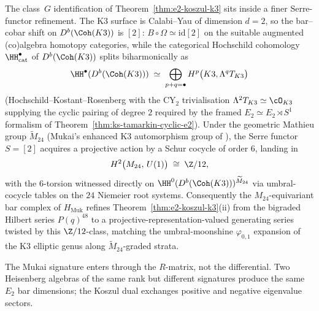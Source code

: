 \begin{remark}
\label{rem:e2-cy2-shift-schur-cocycle}
The class~$G$ identification of Theorem~\ref{thm:e2-koszul-k3} sits inside
a finer Serre-functor refinement. The K3 surface is Calabi--Yau of dimension
$d = 2$, so the bar--cobar shift on $D^{b}(\Coh(K3))$ is $[2]$:
$B \circ \Omega \simeq \mathrm{id}[2]$ on the suitable augmented
(co)algebra homotopy categories, while the categorical Hochschild
cohomology $\HH^{\bullet}_{\mathrm{cat}}$ of $D^{b}(\Coh(K3))$ splits
biharmonically as
\[
 \HH^{\bullet}(D^{b}(\Coh(K3)))
 \;\simeq\; \bigoplus_{p + q = \bullet}
 H^{p}\bigl(K3, \Lambda^{q} T_{K3}\bigr)
\]
(Hochschild--Kostant--Rosenberg with the CY$_2$ trivialisation
$\Lambda^{2} T_{K3} \simeq \cO_{K3}$ supplying the cyclic pairing of
degree $2$ required by the framed $E_2 \simeq E_2 \rtimes S^1$ formalism of
Theorem~\ref{thm:ks-tamarkin-cyclic-e2}). Under the geometric Mathieu group
$\widetilde{M}_{24}$ (Mukai's enhanced K3 automorphism group of
\cite{Mukai1988}), the Serre functor $S = [2]$ acquires a projective
action by a Schur cocycle of order $6$, landing in
\[
 H^{2}\bigl(M_{24},\, U(1)\bigr) \;\cong\; \Z/12,
\]
with the $6$-torsion witnessed directly on
$\HH^{0}(D^{b}(\Coh(K3)))^{\widetilde{M}_{24}}$
via \cite{ChengDuncanHarvey2014}
umbral-cocycle tables on the $24$ Niemeier root systems. Consequently the
$M_{24}$-equivariant bar complex of $H_{\mathrm{Muk}}$ refines
Theorem~\ref{thm:e2-koszul-k3}(ii) from the bigraded Hilbert series
$P(q)^{48}$ to a projective-representation-valued generating series
twisted by this $\Z/12$-class, matching the umbral-moonshine
$\varphi_{0,1}$ expansion of the K3 elliptic genus along
$\widetilde{M}_{24}$-graded strata.
\end{remark}

The Mukai signature enters through the $R$-matrix, not the differential.
Two Heisenberg algebras of the same rank but different signatures
produce the same $E_2$ bar dimensions; the Koszul dual exchanges
positive and negative eigenvalue sectors.

